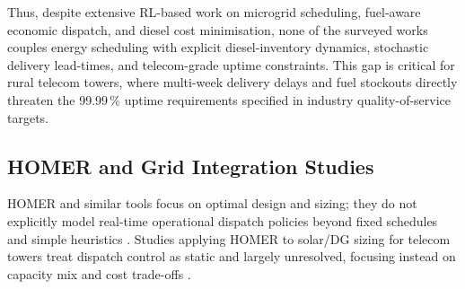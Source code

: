 \begin{table}[t]
\centering
\caption{Representative RL-based microgrid controllers and diesel-fuel/logistics modelling.}
\label{tab:rl_microgrid_comparison}

\setlength{\tabcolsep}{3pt}
\small

\end{table}

Thus, despite extensive RL-based work on microgrid scheduling,
fuel-aware economic dispatch, and diesel cost minimisation,
none of the surveyed works couples energy scheduling with explicit
diesel-inventory dynamics, stochastic delivery lead-times, and telecom-grade
uptime constraints. This gap is critical for rural telecom towers, where
multi-week delivery delays and fuel stockouts directly threaten the 99.99\,\%
uptime requirements specified in industry quality-of-service targets.

\subsection{HOMER and Grid Integration Studies}

HOMER and similar tools focus on optimal design and sizing; they do not
explicitly model real-time operational dispatch policies beyond fixed
schedules and simple heuristics \citep{homer_energy_2020}. Studies applying
HOMER to solar/DG sizing for telecom towers treat dispatch control as static
and largely unresolved, focusing instead on capacity mix and cost trade-offs
\citep{meena2020_homer_telecom}.

